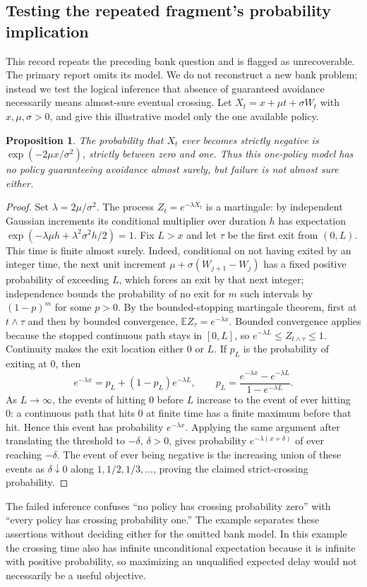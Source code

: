 \documentclass[11pt]{article}
\newtheorem{proposition}{Proposition}
\begin{document}
\subsection{Testing the repeated fragment's probability implication}
This record repeats the preceding bank question and is flagged as unrecoverable. The primary report omits its model. We do not reconstruct a new bank problem; instead we test the logical inference that absence of guaranteed avoidance necessarily means almost-sure eventual crossing. Let $X_t=x+\mu t+\sigma W_t$ with $x,\mu,\sigma>0$, and give this illustrative model only the one available policy.
\begin{proposition}
The probability that $X_t$ ever becomes strictly negative is $\exp(-2\mu x/\sigma^2)$, strictly between zero and one. Thus this one-policy model has no policy guaranteeing avoidance almost surely, but failure is not almost sure either.
\end{proposition}
\begin{proof}
Set $\lambda=2\mu/\sigma^2$. The process $Z_t=e^{-\lambda X_t}$ is a martingale: by independent Gaussian increments its conditional multiplier over duration $h$ has expectation $\exp(-\lambda\mu h+\lambda^2\sigma^2h/2)=1$.
Fix $L>x$ and let $\tau$ be the first exit from $(0,L)$. This time is finite almost surely. Indeed, conditional on not having exited by an integer time, the next unit increment $\mu+\sigma(W_{j+1}-W_j)$ has a fixed positive probability of exceeding $L$, which forces an exit by that next integer; independence bounds the probability of no exit for $m$ such intervals by $(1-p)^m$ for some $p>0$.
By the bounded-stopping martingale theorem, first at $t\wedge\tau$ and then by bounded convergence, $\mathbb E Z_\tau=e^{-\lambda x}$. Bounded convergence applies because the stopped continuous path stays in $[0,L]$, so $e^{-\lambda L}\le Z_{t\wedge\tau}\le1$. Continuity makes the exit location either 0 or $L$. If $p_L$ is the probability of exiting at 0, then
\[
e^{-\lambda x}=p_L+(1-p_L)e^{-\lambda L},
\qquad p_L=\frac{e^{-\lambda x}-e^{-\lambda L}}{1-e^{-\lambda L}}.
\]
As $L\to\infty$, the events of hitting 0 before $L$ increase to the event of ever hitting 0: a continuous path that hits 0 at finite time has a finite maximum before that hit. Hence this event has probability $e^{-\lambda x}$. Applying the same argument after translating the threshold to $-\delta$, $\delta>0$, gives probability $e^{-\lambda(x+\delta)}$ of ever reaching $-\delta$. The event of ever being negative is the increasing union of these events as $\delta\downarrow0$ along $1,1/2,1/3,\ldots$, proving the claimed strict-crossing probability.
\end{proof}
The failed inference confuses ``no policy has crossing probability zero'' with ``every policy has crossing probability one.'' The example separates these assertions without deciding either for the omitted bank model. In this example the crossing time also has infinite unconditional expectation because it is infinite with positive probability, so maximizing an unqualified expected delay would not necessarily be a useful objective.
\end{document}
